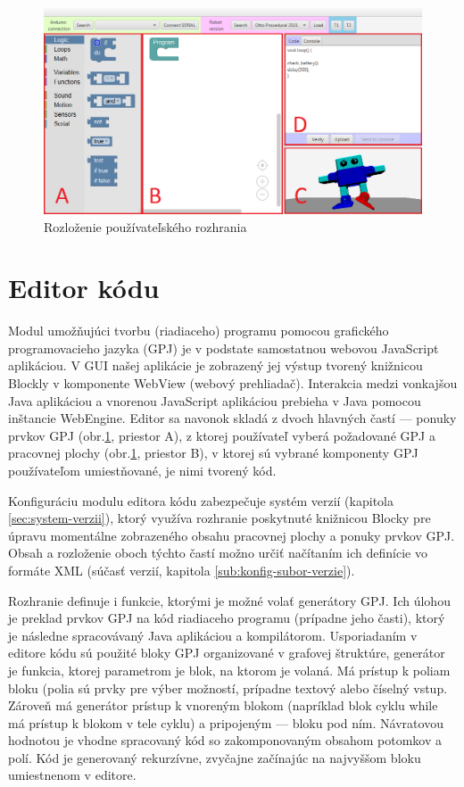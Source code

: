 \begin{figure}
\centerline{\includegraphics[width=1\textwidth]{images/rozlozenie-gui}}
\caption[Rozloženie používateľského rozhrania]{Rozloženie používateľského rozhrania}
\label{obr:gui-layout}
\end{figure}


\section{Editor kódu}
\label{sec:editor-kodu}
Modul umožňujúci tvorbu (riadiaceho) programu pomocou grafického programovacieho jazyka (GPJ) je v podstate samostatnou webovou JavaScript aplikáciou. V GUI našej aplikácie je zobrazený jej výstup tvorený knižnicou Blockly v komponente WebView (webový prehliadač). Interakcia medzi vonkajšou Java aplikáciou a vnorenou JavaScript aplikáciou prebieha v Java pomocou inštancie WebEngine. Editor sa navonok skladá z dvoch hlavných častí --- ponuky prvkov GPJ (obr.\ref{obr:gui-layout}, priestor A), z ktorej používateľ vyberá požadované  GPJ a pracovnej plochy (obr.\ref{obr:gui-layout}, priestor B), v ktorej sú vybrané komponenty GPJ používateľom umiestňované, je nimi tvorený kód.

Konfiguráciu modulu editora kódu zabezpečuje systém verzií (kapitola \ref{sec:system-verzii}), ktorý využíva rozhranie poskytnuté knižnicou Blocky pre úpravu momentálne zobrazeného obsahu pracovnej plochy a ponuky prvkov GPJ. Obsah a rozloženie oboch týchto častí možno určiť načítaním ich definície vo formáte XML (súčasť verzií,  kapitola \ref{sub:konfig-subor-verzie}).

Rozhranie definuje i funkcie, ktorými je možné volať generátory GPJ. Ich úlohou je preklad prvkov GPJ na kód riadiaceho programu (prípadne jeho časti), ktorý je následne spracovávaný Java aplikáciou a kompilátorom. Usporiadaním v editore kódu sú použité bloky GPJ organizované v grafovej štruktúre, generátor je funkcia, ktorej parametrom je blok, na ktorom je volaná. Má prístup k poliam bloku (polia sú prvky pre výber možností, prípadne textový alebo číselný vstup. Zároveň má generátor prístup k vnoreným blokom (napríklad blok cyklu while má prístup k blokom v tele cyklu) a pripojeným  --- bloku pod ním. Návratovou hodnotou je vhodne spracovaný kód so zakomponovaným obsahom potomkov a polí. Kód je generovaný rekurzívne, zvyčajne začínajúc na najvyššom bloku umiestnenom v editore.

